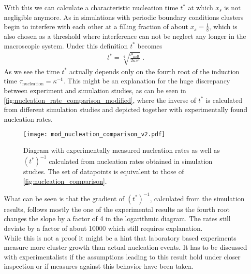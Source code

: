 With this we can calculate a characteristic nucleation time $t^*$ at which $x_s$ is not negligible anymore. As in simulations with periodic boundary conditions clusters begin to interfere with each other at a filling fraction of about $x_s=\frac{1}{8}$, which is also chosen as a threshold where interference can not be neglect any longer in the macroscopic system. Under this definition $t^*$ becomes
\begin{align}
\label{eqn:nucleation_time_modified}
t^* = \sqrt[4]{\frac{\rho_{\text{melt}}}{2 \kappa c^3 }} \; \text{.}
\end{align}
As we see the time $t^*$ actually depends only on the fourth root of the induction time $\tau_{\text{nucleation}} = \kappa^{-1}$. This might be an explanation for the huge discrepancy between experiment and simulation studies, as can be seen in \autoref{fig:nucleation_rate_comparison_modified}, where the inverse of $t^*$ is calculated from different simulation studies and depicted together with experimentally found nucleation rates.\\
\begin{figure}[h]
\centering
\texttt{[image: mod\_nucleation\_comparison\_v2.pdf]}
\caption[Nucleation rate comparison under assumption of early filled boxes]{Diagram with experimentally measured nucleation rates\cite{Harland1997,He1996,schaetzel1993,Sinn2001,Auer2001} as well as $(t^*)^{-1}$ calculated from nucleation rates obtained in simulation studies\cite{Filion2010a,Fiorucci2020a,Schilling2011}. The set of datapoints is equivalent to those of \autoref{fig:nucleation_comparison}.}
\label{fig:nucleation_rate_comparison_modified}
\end{figure}

What can be seen is that the gradient of $(t^*)^{-1}$, calculated from the simulation results, follows mostly the one of the experimental results as the fourth root changes the slope by a factor of 4 in the logarithmic diagram. The rates still deviate by a factor of about 10000 which still requires explanation.\\

While this is not a proof it might be a hint that laboratory based experiments measure more cluster growth than actual nucleation events. It has to be discussed with experimentalists if the assumptions leading to this result hold under closer inspection or if measures against this behavior have been taken.
